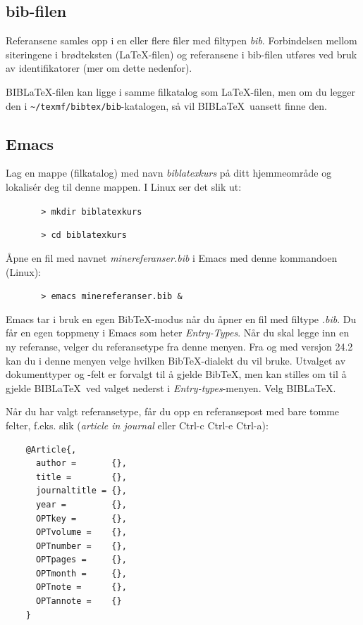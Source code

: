 \documentclass[11pt,norsk,a4paper]{article}
\newcommand{\bt}{BibTeX{}}
\newcommand{\blt}{B{\smaller[2]IB}\discretionary{-}{}{\kern
    -0.12em}\LaTeX{}}
\begin{document}
\subsection{bib-filen}
Referansene samles opp i en eller flere filer med filtypen
\textit{bib}. Forbindelsen mellom siteringene i brødteksten
(\LaTeX-filen) og referansene i bib-filen utføres ved bruk av
identifikatorer (mer om dette nedenfor).

\blt-filen kan ligge i samme filkatalog som \LaTeX-filen, men om du
legger den i \verb=~/texmf/bibtex/bib=-katalogen, så vil \blt\ uansett
finne den.


\subsection{Emacs}
Lag en mappe (filkatalog) med navn \textit{biblatexkurs} på ditt
hjemmeområde og lokalisér deg til denne mappen. I Linux ser det slik ut:

\verb=       > mkdir biblatexkurs =

\verb=       > cd biblatexkurs =

\noindent{}Åpne en fil med navnet \textit{minereferanser.bib} i Emacs med denne
kommandoen (Linux):

\verb=       > emacs minereferanser.bib &=

\noindent{}Emacs tar i bruk en egen \bt-modus når du åpner en fil med filtype
\textit{.bib}.  Du får en egen toppmeny i Emacs som heter \textit{Entry-Types}. Når du
skal legge inn en ny referanse, velger du referansetype fra denne
menyen. Fra og med versjon 24.2 kan du i denne menyen velge hvilken \bt-dialekt du vil bruke. Utvalget av dokumenttyper og -felt er forvalgt til å gjelde \bt, men kan stilles om til å gjelde \blt\ ved valget nederst i \textit{Entry-types}-menyen. Velg \blt.

Når du har valgt referansetype, får du opp en referansepost med bare
tomme felter, f.eks. slik (\textit{article in journal} eller Ctrl-c Ctrl-e
Ctrl-a):

{\footnotesize\begin{verbatim}
    @Article{,
      author =       {},
      title =        {},
      journaltitle = {},
      year =         {},
      OPTkey =       {},
      OPTvolume =    {},
      OPTnumber =    {},
      OPTpages =     {},
      OPTmonth =     {},
      OPTnote =      {},
      OPTannote =    {}
    }
\end{verbatim}}
\end{document}
